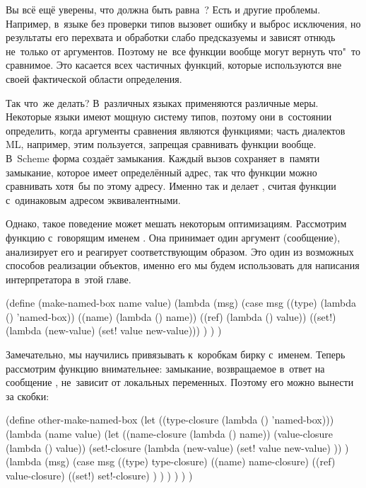 Вы всё ещё уверены, что  должна быть равна~? Есть и другие
проблемы. Например, в~языке без проверки типов  вызовет ошибку и
выброс исключения, но результаты его перехвата и обработки слабо предсказуемы и
зависят отнюдь не~только от аргументов. Поэтому не~все функции вообще могут
вернуть что"~то сравнимое. Это касается всех частичных функций, которые используются вне своей фактической области
определения.

Так что~же делать? В~различных языках применяются различные меры. Некоторые
языки имеют мощную систему типов, поэтому они в~состоянии определить, когда
аргументы сравнения являются функциями; часть диалектов ML, например, этим
пользуется, запрещая сравнивать функции вообще. В~Scheme форма 
создаёт замыкания. Каждый вызов  сохраняет в~памяти замыкание,
которое имеет определённый адрес, так что функции можно сравнивать хотя~бы по
этому адресу. Именно так и делает , считая функции с~одинаковым адресом
эквивалентными.

Однако, такое поведение может мешать некоторым оптимизациям. Рассмотрим функцию
с~говорящим именем . Она принимает один аргумент (сообщение),
анализирует его и реагирует соответствующим образом. Это один из возможных
способов реализации объектов, именно его мы будем использовать для написания
интерпретатора в~этой главе.

\begin{code:lisp}
(define (make-named-box name value)
  (lambda (msg)
    (case msg
      ((type) (lambda () 'named-box))
      ((name) (lambda () name))
      ((ref)  (lambda () value))
      ((set!) (lambda (new-value) (set! value new-value))) ) ) )
\end{code:lisp}

Замечательно, мы научились привязывать к~коробкам бирку с~именем. Теперь
рассмотрим функцию внимательнее: замыкание, возвращаемое в~ответ на сообщение
, не~зависит от локальных переменных. Поэтому его можно вынести за
скобки:

\begin{code:lisp}
(define other-make-named-box
  (let ((type-closure (lambda () 'named-box)))
    (lambda (name value)
      (let ((name-closure  (lambda () name))
            (value-closure (lambda () value))
            (set!-closure  (lambda (new-value)
                             (set! value new-value) )) )
        (lambda (msg)
          (case msg
            ((type) type-closure)
            ((name) name-closure)
            ((ref)  value-closure)
            ((set!) set!-closure) ) ) ) ) ) )
\end{code:lisp}

